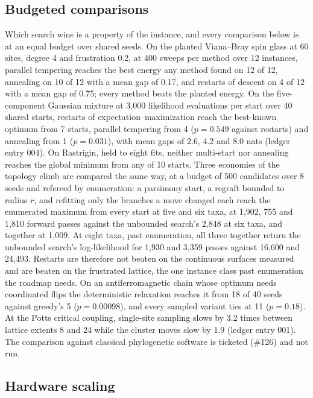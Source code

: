 \documentclass[11pt,a4paper]{article}
\begin{document}
\subsection{Budgeted comparisons}
\label{sec:res-budget}

Which search wins is a property of the instance, and every comparison below
is at an equal budget over shared seeds. On the planted Viana--Bray spin
glass at 60 sites, degree 4 and frustration 0.2, at 400 sweeps per method
over 12 instances, parallel tempering reaches the best energy any method
found on 12 of 12, annealing on 10 of 12 with a mean gap of 0.17, and
restarts of descent on 4 of 12 with a mean gap of 0.75; every method beats
the planted energy. On the five-component Gaussian mixture at 3,000
likelihood evaluations per start over 40 shared starts, restarts of
expectation--maximization reach the best-known optimum from 7 starts,
parallel tempering from 4 ($p = 0.549$ against restarts) and annealing from
1 ($p = 0.031$), with mean gaps of 2.6, 4.2 and 8.0 nats (ledger entry 004).
On Rastrigin, held to eight fits, neither multi-start nor annealing reaches
the global minimum from any of 10 starts. Three economies of the topology
climb are compared the same way, at a budget of 500 candidates over 8 seeds
and refereed by enumeration: a parsimony start, a regraft bounded to radius
$r$, and refitting only the branches a move changed each reach the enumerated
maximum from every start at five and six taxa, at 1,902, 755 and 1,810 forward
passes against the unbounded search's 2,848 at six taxa, and together at 1,009.
At eight taxa, past enumeration, all three together return the unbounded
search's log-likelihood for 1,930 and 3,359 passes against 16,600 and 24,493.
Restarts are therefore not beaten on the continuous surfaces measured and are
beaten on the frustrated lattice, the one instance class past enumeration the
roadmap needs. On an antiferromagnetic chain whose optimum needs coordinated
flips the deterministic relaxation reaches it from 18 of 40 seeds against
greedy's 5 ($p = 0.00098$), and every sampled variant ties at 11 ($p = 0.18$).
At the Potts critical coupling, single-site sampling slows by 3.2 times
between lattice extents 8 and 24 while the cluster moves slow by 1.9
(ledger entry 001). The comparison against classical phylogenetic software
is ticketed (\#126) and not run.

\subsection{Hardware scaling}
\label{sec:res-hardware}
\end{document}
